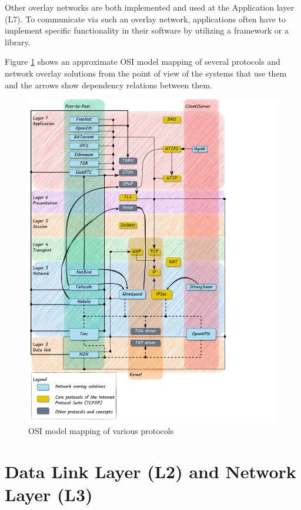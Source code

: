 Other overlay networks are both implemented and used at the Application layer (L7). To communicate via such an overlay network, applications often have to implement specific functionality in their software by utilizing a framework or a library.

Figure \ref{osi-map-overlays} shows an approximate OSI model mapping of several protocols and network overlay solutions from the point of view of the systems that use them and the arrows show dependency relations between them.

\begin{figure}
\centering
\includegraphics[width=\textwidth,height=0.9\textheight]{thesis/../figures/osi-map-overlays.drawio.pdf}
\caption{OSI model mapping of various protocols \label{osi-map-overlays}}
\end{figure}

\section{Data Link Layer (L2) and Network Layer (L3)}\label{thesis__022-overlays.md__data-link-layer-l2-and-network-layer-l3}


